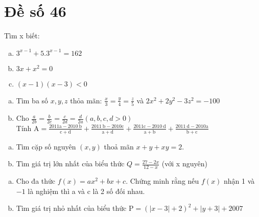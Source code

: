 \section{Đề số 46}

\begin{bt} 
	Tìm x biết:
	\begin{enumerate}[a.]
		\item $3^{x-1}+5.3^{x-1}=162$
		\item $3 x+x^2=0$
		\item $(x-1)(x-3)<0$
	\end{enumerate}
	\loigiai{} 
\end{bt}

\begin{bt}
	\hfill
	\begin{enumerate}[a.]
		\item Tìm ba số $x, y, z$ thỏa mãn: $\frac{x}{3}=\frac{y}{4}=\frac{z}{5}$ và $2 x^2+2 y^2-3 z^2=-100$
		\item Cho $\frac{a}{2 b}=\frac{b}{2 c}=\frac{c}{2 d}=\frac{d}{2 a}(a, b, c, d>0)$
		\\Tính $\mathrm{A}=\frac{2011 \mathrm{a}-2010 \mathrm{~b}}{\mathrm{c}+\mathrm{d}}+\frac{2011 \mathrm{~b}-2010 \mathrm{c}}{\mathrm{a}+\mathrm{d}}+\frac{2011 \mathrm{c}-2010 \mathrm{~d}}{\mathrm{a}+\mathrm{b}}+\frac{2011 \mathrm{~d}-2010 \mathrm{a}}{\mathrm{b}+\mathrm{c}}$
	\end{enumerate}
	\loigiai{} 
\end{bt}

\begin{bt}
	\hfill
	\begin{enumerate}[a.]
		\item Tìm cặp số nguyên $(x, y)$ thoả mãn $x+y+x y=2$.
		\item Tìm giá trị lớn nhất của biểu thức $Q=\frac{27-2 x}{12-x}$ (với x nguyên)
	\end{enumerate}
	
	\loigiai{} 
\end{bt}

\begin{bt}
	\hfill
	\begin{enumerate}[a.]
		\item  Cho đa thức $f(x)=a x^2+b x+c$. Chứng minh rằng nếu $f(x)$ nhận 1 và $-1$ là nghiệm thì a và c là 2 số đối nhau.
		\item Tìm giá trị nhỏ nhất của biểu thức $\mathrm{P}=(|x-3|+2)^2+|y+3|+2007$
	\end{enumerate}
	\loigiai{} 
\end{bt}

